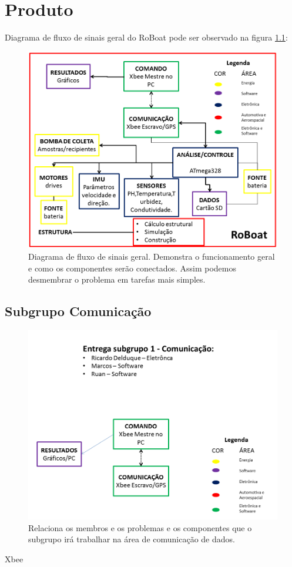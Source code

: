 \chapter[Produto]{Produto}


 Diagrama de fluxo de sinais geral do RoBoat pode ser observado na figura \ref{fluxodesinais}:
 
 \begin{figure} [!htp]
	\centering
	\includegraphics[scale=0.7]{figuras/diagramaGERAL}
	\caption{Diagrama de fluxo de sinais geral. Demonstra o funcionamento geral e como os componentes serão conectados. Assim podemos desmembrar o problema em tarefas mais simples.}
	\label{fluxodesinais}
\end{figure}


\FloatBarrier

\section{Subgrupo Comunicação}

\begin{figure} [!htp]
	\centering
	\includegraphics[scale=0.6]{figuras/subgrupocomuncacao}
	\caption{Relaciona os membros e os problemas e os componentes que o subgrupo irá trabalhar na área de comunicação de dados.}
	\label{subgrupocomunicacao}
\end{figure}
\FloatBarrier
Xbee


